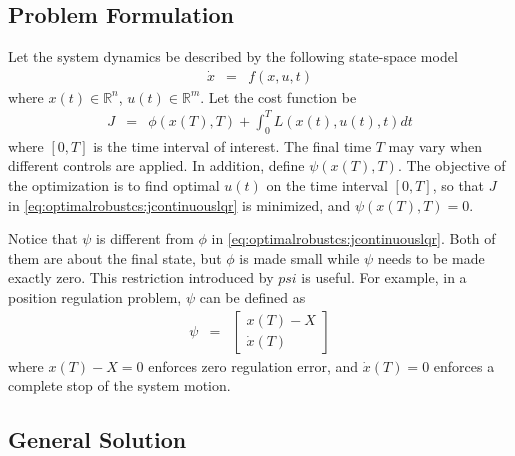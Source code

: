 \subsection{Problem Formulation}

Let the system dynamics be described by the following state-space model
\begin{eqnarray}
	\dot{x} &=& f(x, u, t) \nonumber
\end{eqnarray}
where $x(t)\in \mathbb{R}^n$, $u(t)\in\mathbb{R}^m$. Let the cost function be
\begin{eqnarray}
	J &=& \phi\left(x(T), T\right) + \int_{0}^{T} L\left(x(t), u(t), t\right)dt \label{eq:optimalrobustcs:jcontinuouslqr}
\end{eqnarray}
where $[0, T]$ is the time interval of interest. The final time $T$ may vary when different controls are applied. In addition, define $\psi\left(x(T), T\right)$. The objective of the optimization is to find optimal $u(t)$ on the time interval $[0, T]$, so that $J$ in \eqref{eq:optimalrobustcs:jcontinuouslqr} is minimized, and $\psi\left(x(T), T\right) = 0$.

Notice that $\psi$ is different from $\phi$ in \eqref{eq:optimalrobustcs:jcontinuouslqr}. Both of them are about the final state, but $\phi$ is made small while $\psi$ needs to be made exactly zero. This restriction introduced by $psi$ is useful. For example, in a position regulation problem, $\psi$ can be defined as
\begin{eqnarray}
	\psi &=& \left[\begin{array}{c}
		x(T) - X \\ \dot{x}(T)
	\end{array}\right] \nonumber
\end{eqnarray}
where $x(T) - X=0$ enforces zero regulation error, and $\dot{x}(T)=0$ enforces a complete stop of the system motion.

\subsection{General Solution}

